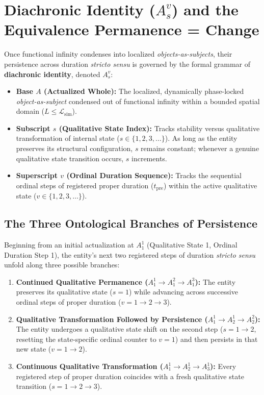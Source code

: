 \documentclass[11pt,a4paper]{article}
\begin{document}
\section{Diachronic Identity ($A_s^v$) and the Equivalence Permanence = Change}

Once functional infinity condenses into localized \emph{objects-as-subjects}, their persistence across duration \emph{stricto sensu} is governed by the formal grammar of \textbf{diachronic identity}, denoted \textbf{$A_s^v$}:

\begin{itemize}
    \item \textbf{Base $A$ (Actualized Whole):} The localized, dynamically phase-locked \emph{object-as-subject} condensed out of functional infinity within a bounded spatial domain ($L \le \mathcal{L}_{\mathrm{sim}}$).
    \item \textbf{Subscript $s$ (Qualitative State Index):} Tracks stability versus qualitative transformation of internal state ($s \in \{1, 2, 3, \dots\}$). As long as the entity preserves its structural configuration, $s$ remains constant; whenever a genuine qualitative state transition occurs, $s$ increments.
    \item \textbf{Superscript $v$ (Ordinal Duration Sequence):} Tracks the sequential ordinal steps of registered proper duration ($t_{\mathrm{pre}}$) within the active qualitative state ($v \in \{1, 2, 3, \dots\}$).
\end{itemize}

\subsection{The Three Ontological Branches of Persistence}
Beginning from an initial actualization at \textbf{$A_1^1$} (Qualitative State 1, Ordinal Duration Step 1), the entity's next two registered steps of duration \emph{stricto sensu} unfold along three possible branches:

\begin{enumerate}
    \item \textbf{Continued Qualitative Permanence ($A_1^1 \to A_1^2 \to A_1^3$):} The entity preserves its qualitative state ($s = 1$) while advancing across successive ordinal steps of proper duration ($v = 1 \to 2 \to 3$).
    \item \textbf{Qualitative Transformation Followed by Persistence ($A_1^1 \to A_2^1 \to A_2^2$):} The entity undergoes a qualitative state shift on the second step ($s = 1 \to 2$, resetting the state-specific ordinal counter to $v = 1$) and then persists in that new state ($v = 1 \to 2$).
    \item \textbf{Continuous Qualitative Transformation ($A_1^1 \to A_2^1 \to A_3^1$):} Every registered step of proper duration coincides with a fresh qualitative state transition ($s = 1 \to 2 \to 3$).
\end{enumerate}
\end{document}
